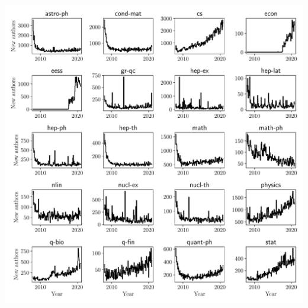 \documentclass{nature}
\makeatletter
\renewenvironment*{figure}{\@float{figure}}{\end@float}
\makeatother
\begin{document}
\begin{figure}
	\includegraphics[width=\textwidth]{new-authors-segmented-by-field}
	\caption{The number of new author names appearing in the literature by field. Fields established well before 2007 (e.g., astro-ph) show an apparent influx of authors at the time the data starts (2007). These author names are dominated by established academics. The slow change in new author count after 2010 approximates the net number of new academics joining the field. Note the spike in new authors in quantitative biology in 2020.}
		\label{fig:new-authors-segmented-by-field}
\end{figure}
\end{document}
